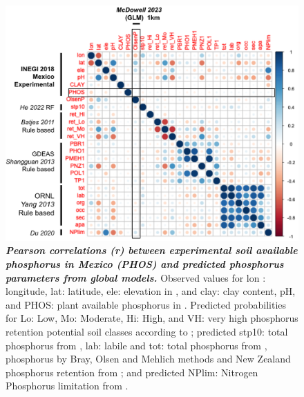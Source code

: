 \begin{figure}[!ht]
\centering
\includegraphics[width=0.65\paperwidth]{Chapter-2/figs/PHOS_correlation.png}
\caption[Pearson correlations (r) between experimental soil available phosphorus in Mexico (PHOS) and predicted phosphorus parameters from global models]{\textit{\textbf{Pearson correlations (r) between experimental soil available phosphorus in Mexico (PHOS) and predicted phosphorus parameters from global models.}} Observed values for lon : longitude, lat: latitude, ele: elevation in \citep{inegi2013}, and clay: clay content, pH, and PHOS: plant available phosphorus in \citep{inegi2013}. Predicted probabilities for Lo: Low, Mo: Moderate, Hi: High, and VH: very high phosphorus retention potential soil classes according to \citep{batjes2011}; predicted
stp10: total phosphorus from \citep{hexianjin2022}, lab: labile and tot: total phosphorus from \citep{yang2013}, phosphorus by Bray, Olsen and Mehlich methods and New Zealand phosphorus retention  from \citep{shangguan2014}; and predicted NPlim: Nitrogen Phosphorus limitation from \citep{du2020}. } 
\label{fig::phoscorrelation}
\end{figure}
\clearpage

